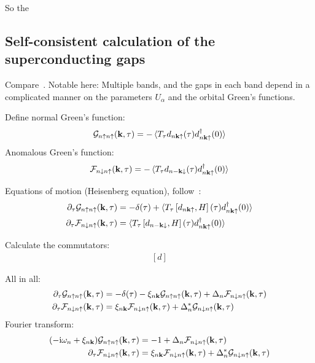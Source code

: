 So the 


\subsection{Self-consistent calculation of the superconducting gaps}

Compare~\cite[ch. 10]{Bruus_Flensberg_2004}.
Notable here: Multiple bands, and the gaps in each band depend in a complicated manner on the parameters \(U_{\alpha}\) and the orbital Green's functions.

Define normal Green's function:
\begin{equation}
    \mathcal{G}_{n\uparrow n\uparrow} (\bm{\mathrm{k}}, \tau) = -\braket{T_{\tau} d_{n \bm{\mathrm{k}} \uparrow} (\tau) d_{n \bm{\mathrm{k}} \uparrow}^{\dagger} (0)}
\end{equation}
Anomalous Green's function:
\begin{equation}
    \mathcal{F}_{n\downarrow n\uparrow} (\bm{\mathrm{k}}, \tau) = -\braket{T_{\tau} d_{n -\bm{\mathrm{k}} \downarrow} (\tau) d_{n \bm{\mathrm{k}} \uparrow}^{\dagger} (0)}
\end{equation}

Equations of motion (Heisenberg equation), follow~\cite[ch. 17]{Bruus_Flensberg_2004}:
\begin{align}
    \pdif{\tau} \mathcal{G}_{n\uparrow n\uparrow} (\vb{k}, \tau) &= -\delta (\tau) + \braket{T_{\tau} \left[d_{n \vb{k} \uparrow}, H\right] (\tau) d_{n \vb{k} \uparrow}^{\dagger} (0)} \\
    \pdif{\tau} \mathcal{F}_{n\downarrow n\uparrow} (\vb{k}, \tau) &= \braket{T_{\tau} \left[d_{n -\vb{k} \downarrow}, H\right] (\tau) d_{n \vb{k} \uparrow}^{\dagger} (0)}
\end{align}

Calculate the commutators:
\begin{align}
    \left[ d \right]
\end{align}

All in all:
\begin{align}
    \pdif{\tau} \mathcal{G}_{n \uparrow n \uparrow} (\vb{k}, \tau) &= -\delta(\tau) - \xi_{n \vb{k}} \mathcal{G}_{n \uparrow n \uparrow} (\vb{k}, \tau) + \Delta_{n} \mathcal{F}_{n\downarrow n\uparrow} (\vb{k}, \tau) \\
    \pdif{\tau} \mathcal{F}_{n \downarrow n \uparrow} (\vb{k}, \tau) &= \xi_{n \vb{k}} \mathcal{F}_{n \downarrow n \uparrow} (\vb{k}, \tau) + \Delta_{n}^* \mathcal{G}_{n\downarrow n\uparrow} (\vb{k}, \tau)
\end{align}
Fourier transform:
\begin{align}
    (-\iu \omega_n + \xi_{n \vb{k}}) \mathcal{G}_{n \uparrow n \uparrow} (\vb{k}, \tau) &= -1 + \Delta_{n} \mathcal{F}_{n\downarrow n\uparrow} (\vb{k}, \tau) \\
    \pdif{\tau} \mathcal{F}_{n \downarrow n \uparrow} (\vb{k}, \tau) &= \xi_{n \vb{k}} \mathcal{F}_{n \downarrow n \uparrow} (\vb{k}, \tau) + \Delta_{n}^* \mathcal{G}_{n\downarrow n\uparrow} (\vb{k}, \tau)
\end{align}

